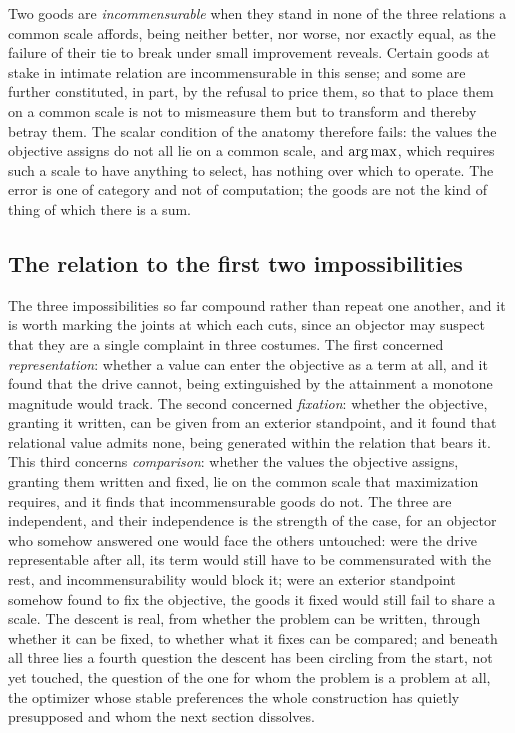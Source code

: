 \begin{claim}[Incommensurability]
Two goods are \emph{incommensurable} when they stand in none of the three relations a common scale affords, being neither better, nor worse, nor exactly equal, as the failure of their tie to break under small improvement reveals. Certain goods at stake in intimate relation are incommensurable in this sense; and some are further constituted, in part, by the refusal to price them, so that to place them on a common scale is not to mismeasure them but to transform and thereby betray them. The scalar condition of the anatomy therefore fails: the values the objective assigns do not all lie on a common scale, and $\operatorname*{arg\,max}$, which requires such a scale to have anything to select, has nothing over which to operate. The error is one of category and not of computation; the goods are not the kind of thing of which there is a sum.
\end{claim}

\subsection*{The relation to the first two impossibilities}

The three impossibilities so far compound rather than repeat one another, and it is worth marking the joints at which each cuts, since an objector may suspect that they are a single complaint in three costumes. The first concerned \emph{representation}: whether a value can enter the objective as a term at all, and it found that the drive cannot, being extinguished by the attainment a monotone magnitude would track. The second concerned \emph{fixation}: whether the objective, granting it written, can be given from an exterior standpoint, and it found that relational value admits none, being generated within the relation that bears it. This third concerns \emph{comparison}: whether the values the objective assigns, granting them written and fixed, lie on the common scale that maximization requires, and it finds that incommensurable goods do not. The three are independent, and their independence is the strength of the case, for an objector who somehow answered one would face the others untouched: were the drive representable after all, its term would still have to be commensurated with the rest, and incommensurability would block it; were an exterior standpoint somehow found to fix the objective, the goods it fixed would still fail to share a scale. The descent is real, from whether the problem can be written, through whether it can be fixed, to whether what it fixes can be compared; and beneath all three lies a fourth question the descent has been circling from the start, not yet touched, the question of the one for whom the problem is a problem at all, the optimizer whose stable preferences the whole construction has quietly presupposed and whom the next section dissolves.
